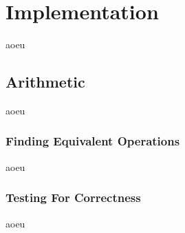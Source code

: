 \section{Implementation}
\label{implementation}
aoeu

\subsection{Arithmetic}
aoeu

\subsubsection{Finding Equivalent Operations}
aoeu

\subsubsection{Testing For Correctness}
aoeu






